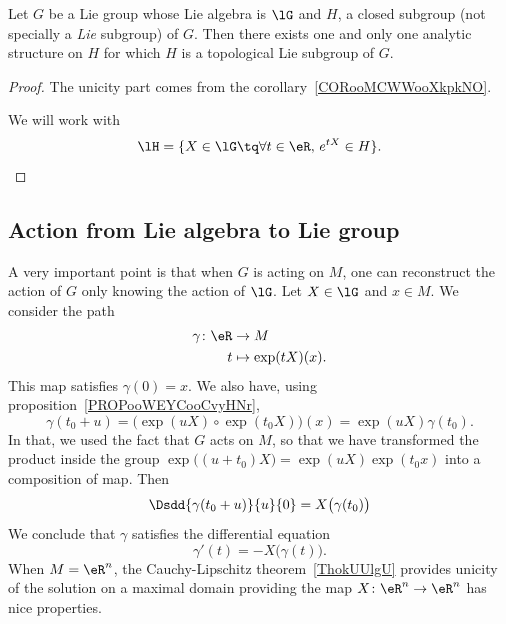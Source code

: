 \begin{theorem} \label{THOooXVXBooZDJzQo}
	Let $G$ be a Lie group whose Lie algebra is $\lG$ and $H$, a closed subgroup (not specially a \emph{Lie} subgroup) of $G$. Then there exists one and only one analytic structure on $H$ for which $H$ is a topological Lie subgroup of $G$.
\end{theorem}


\begin{proof}
	The unicity part comes from the corollary~\ref{CORooMCWWooXkpkNO}.

	We will work with
	\begin{equation}\label{eq:lH_de_G}
		\lH=\{X\in\lG\tq \forall t\in\eR,\, e^{tX}\in H\}.
	\end{equation}
\end{proof}

\subsection{Action from Lie algebra to Lie group}

A very important point\cite{ooOLNIooDLmxkR} is that when \( G\) is acting on $M$, one can reconstruct the action of \( G\) only knowing the action of \( \lG\). Let \( X\in \lG\) and \( x\in M\). We consider the path
\begin{equation}
	\begin{aligned}
		\gamma\colon \eR & \to M                \\
		t                & \mapsto \exp(tX)(x).
	\end{aligned}
\end{equation}
This map satisfies \( \gamma(0)=x\). We also have, using proposition~\ref{PROPooWEYCooCvyHNr},
\begin{equation}
	\gamma(t_0+u)=\big( \exp(uX)\circ\exp(t_0X)\big)(x)=\exp(uX)\gamma(t_0).
\end{equation}
In that, we used the fact that \( G\) acts on \( M\), so that we have transformed the product inside the group \( \exp\big( (u+t_0)X \big)= \exp(uX)\exp(t_0x) \) into a composition of map.  Then
\begin{equation}
	\Dsdd{ \gamma(t_0+u) }{u}{0}=X\big( \gamma(t_0) \big)
\end{equation}
We conclude that \( \gamma\) satisfies the differential equation
\begin{equation}        \label{EQooFGSIooUplbmN}
	\gamma'(t)=-X\big( \gamma(t) \big).
\end{equation}
When \( M=\eR^n\), the Cauchy-Lipschitz theorem~\ref{ThokUUlgU} provides unicity of the solution on a maximal domain providing the map \( X\colon \eR^n\to \eR^n\) has nice properties.

